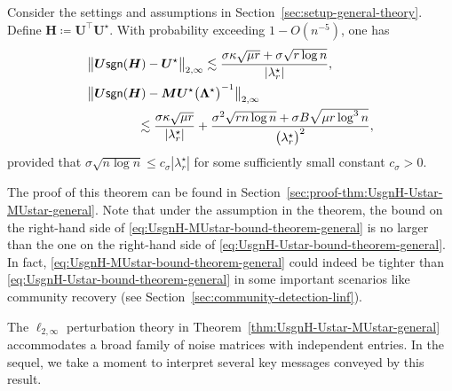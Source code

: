 \begin{theorem}
\label{thm:UsgnH-Ustar-MUstar-general}
	Consider the settings and assumptions in Section~\ref{sec:setup-general-theory}. Define $\bm{H} \coloneqq \bm{U}^{\top}\bm{U}^{\star}$. With probability exceeding $1-O(n^{-5})$, one has
%
\begin{subequations}
\label{eq:UsgnH-Ustar-MUstar-bound-theorem-general}
\begin{align}
& \big\|\bm{U}\mathsf{sgn}(\bm{H})-\bm{U}^{\star}\big\|_{2,\infty}  \lesssim \frac{\sigma\kappa\sqrt{\mu r}+\sigma\sqrt{r\log n}}{ |\lambda_{r}^{\star} | },
\label{eq:UsgnH-Ustar-bound-theorem-general}\\
& \big\|\bm{U}\mathsf{sgn}(\bm{H})-\bm{M}\bm{U}^{\star}\big(\bm{\Lambda}^{\star}\big)^{-1}\big\|_{2,\infty} \notag\\
& \qquad\qquad \lesssim \frac{\sigma\kappa\sqrt{\mu r}}{ |\lambda_{r}^{\star} | }+ \frac{\sigma^{2}\sqrt{rn\log n}+\sigma B\sqrt{\mu r\log^{3}n}}{\big(\lambda_{r}^{\star}\big)^{2}}, 
\label{eq:UsgnH-MUstar-bound-theorem-general}
\end{align}
\end{subequations}
%
provided that $\sigma \sqrt{n \log n}  \leq c_{\sigma} |\lambda_r^{\star}|$ for some sufficiently small constant $c_{\sigma}>0$.
\end{theorem}
%
The proof of this theorem can be found in Section~\ref{sec:proof-thm:UsgnH-Ustar-MUstar-general}. 
Note that under the assumption in the theorem, the bound on the right-hand side of 
\eqref{eq:UsgnH-MUstar-bound-theorem-general} is no larger than the one on the right-hand side of \eqref{eq:UsgnH-Ustar-bound-theorem-general}. 
In fact, \eqref{eq:UsgnH-MUstar-bound-theorem-general} could indeed be tighter than \eqref{eq:UsgnH-Ustar-bound-theorem-general} in some important scenarios like community recovery (see Section~\ref{sec:community-detection-linf}).


The $\ell_{2,\infty}$ perturbation theory in Theorem~\ref{thm:UsgnH-Ustar-MUstar-general} accommodates a broad family of noise matrices with independent entries.
In the sequel, we take a moment to interpret several key messages conveyed by this result.



